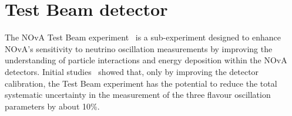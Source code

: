 


\section{Test Beam detector}\label{sec:TestBeamCalibration}

The \gls{NOvA} Test Beam experiment~\cite{NOvATestBeamWallbangProceedings2020.pdf} is a sub-experiment designed to enhance \gls{NOvA}'s sensitivity to neutrino oscillation measurements by improving the understanding of particle interactions and energy deposition within the \gls{NOvA} detectors. Initial studies~\cite{NOvA-doc-33012} showed that, only by improving the detector calibration, the Test Beam experiment has the potential to reduce the total systematic uncertainty in the measurement of the three flavour oscillation parameters by about 10\%.
 
